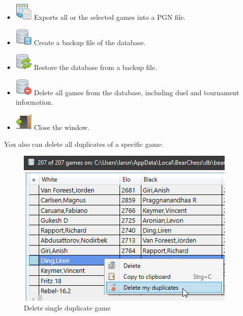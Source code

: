 \documentclass[11pt,a4paper]{article}
\begin{document}
\begin{itemize}
	\item \includegraphics[scale=0.5]{text_exports.png} Exports all or the selected games into a PGN file.
	\item \includegraphics[scale=0.5]{database_save.png} Create a backup file of the database.
	\item \includegraphics[scale=0.5]{database_refresh.png} Restore the database from a backup file.
	\item \includegraphics[scale=0.5]{database_delete.png} Delete all games from the database, including duel and tournament information.
	\item \includegraphics[scale=0.5]{door_out.png} Close the window.
\end{itemize}

You also can delete all duplicates of a specific game:
\begin{figure}[H]
	\centering
	\includegraphics[scale=0.9]{Games7.png}
	\caption{Delete single duplicate game}
	\label{fig:Games7}
\end{figure}
\end{document}

